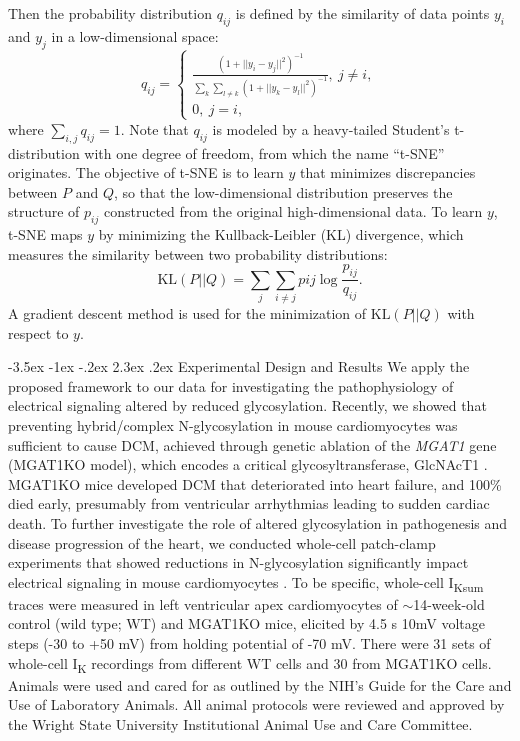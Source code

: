 \documentclass[11pt]{article}
\makeatletter
\renewcommand\section{\@startsection {section}{1}{\z@}%
                                   {-3.5ex \@plus -1ex \@minus -.2ex}%
                                   {2.3ex \@plus.2ex}%
                                   {\normalfont\fontfamily{phv}\fontsize{16}{19}\bfseries}}
\makeatother
\begin{document}
Then the probability distribution $q_{ij}$ is defined by the similarity of data points $y_i$ and $y_j$ in a low-dimensional space:
\begin{equation}
    q_{ij} = 
    \begin{cases}\frac{(1+||y_{i}-y_{j}||^{2})^{-1}}{\sum\limits_{k}\sum\limits_{l \neq k}(1+||y_{k}-y_{l}||^{2})^{-1}}, \ j \neq i, \\
    0, \ j=i,
    \end{cases}
\end{equation}
where $\sum\limits_{i,j}q_{ij}=1$. Note that $q_{ij}$ is modeled by a heavy-tailed Student's t-distribution with one degree of freedom, from which the name ``t-SNE'' originates. The objective of t-SNE is to learn $y$ that minimizes discrepancies between $P$ and $Q$, so that the low-dimensional distribution preserves the structure of $p_{ij}$ constructed from the original high-dimensional data. To learn $y$, t-SNE maps $y$ by minimizing the Kullback-Leibler (KL) divergence, which measures the similarity between two probability distributions:
\begin{equation}
    \mathrm{KL}(P||Q) = \sum\limits_{j}\sum\limits_{i \neq j}p{ij}\log \frac{p_{ij}}{q_{ij}}.
\end{equation}
A gradient descent method is used for the minimization of $\mathrm{KL}(P||Q)$ with respect to $y$.

\section{Experimental Design and Results}
We apply the proposed framework to our data for investigating the pathophysiology of electrical signaling altered by reduced glycosylation. Recently, we showed that preventing hybrid/complex N-glycosylation in mouse cardiomyocytes was sufficient to cause DCM, achieved through genetic ablation of the \textit{MGAT1} gene (MGAT1KO model), which encodes a critical glycosyltransferase, GlcNAcT1 \citep{ednie2019reduced,ednie2019reduced2}. MGAT1KO mice developed DCM that deteriorated into heart failure, and 100\% died early, presumably from ventricular arrhythmias leading to sudden cardiac death. To further investigate the role of altered glycosylation in pathogenesis and disease progression of the heart, we conducted whole-cell patch-clamp experiments that showed reductions in N-glycosylation significantly impact electrical signaling in mouse cardiomyocytes \citep{ednie2019reduced}. To be specific, whole-cell I\textsubscript{Ksum} traces were measured in left ventricular apex cardiomyocytes of $\sim$14-week-old control (wild type; WT) and MGAT1KO mice, elicited by 4.5 s 10mV voltage steps (-30 to +50 mV) from holding potential of -70 mV. There were 31 sets of whole-cell I\textsubscript{K} recordings from different WT cells and 30 from MGAT1KO cells. Animals were used and cared for as outlined by the NIH’s Guide for the Care and Use of Laboratory Animals. All animal protocols were reviewed and approved by the Wright State University Institutional Animal Use and Care Committee.
\end{document}
